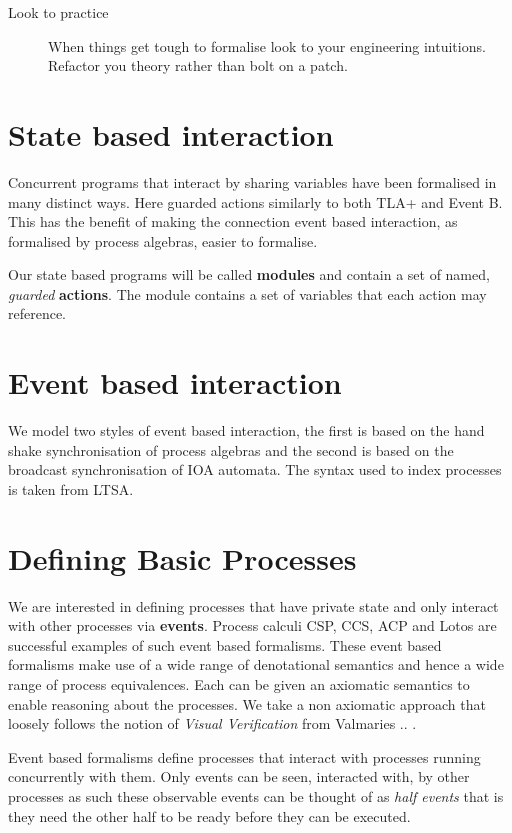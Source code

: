 \documentclass[]{article}
\begin{document}
{\begin{description}
\item[Look to practice]  When things get tough to formalise look to your engineering intuitions. Refactor you theory rather than bolt on a patch.
\end{description}

\section{State based interaction}
Concurrent programs that interact by sharing variables have been formalised in many distinct ways. Here guarded actions similarly to both TLA+  and Event B.  This has the benefit of making the  connection  event based interaction, as formalised by process algebras, easier to formalise.

Our state based programs will be called {\bf modules} and contain a set of named, \emph{guarded} {\bf actions}. The module contains a set of variables  that each action may reference.

\section{Event based interaction}
We model two styles of  event based interaction, the first  is based on the hand shake synchronisation of   process algebras and the second is based on the broadcast synchronisation of IOA automata. The syntax used to index processes is taken from LTSA.
}


\section{Defining Basic Processes}
We are interested in defining processes that have private state and only interact with other processes via {\bf events}. Process calculi CSP, CCS, ACP and  Lotos  are  successful examples of such event based formalisms.
These event based formalisms make use of a wide range of denotational semantics and hence  a wide range of process equivalences.  Each can be  given an axiomatic semantics to enable  reasoning about the processes. We take a non axiomatic  approach that loosely   follows the notion of \emph{Visual Verification}  from  Valmaries .. \cite{}.

Event based formalisms define processes that interact with processes running concurrently with them. Only events can be seen, interacted with, by other processes as such these observable events can be thought of as \emph{half events} that is they need the other half to be ready before they can be executed.
\end{document}
